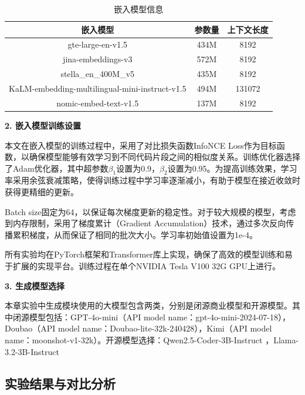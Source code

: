     \begin{table}[htbp]
    \caption{嵌入模型信息}
    \label{2_嵌入模型参数量}
    \vspace{0.5em}\centering\wuhao
    \begin{tabular}{ccc}
    \toprule
    嵌入模型 & 参数量 & 上下文长度  \\
    \midrule
    gte-large-en-v1.5 & 434M & 8192 \\
    jina-embeddings-v3 & 572M & 8192\\
    stella\_en\_400M\_v5 & 435M & 8192 \\
    KaLM-embedding-multilingual-mini-instruct-v1.5 & 494M & 131072 \\
    nomic-embed-text-v1.5 & 137M & 8192 \\
    \bottomrule
    \end{tabular}
    \end{table}

\noindent \textbf{2. 嵌入模型训练设置}

本文在嵌入模型的训练过程中，采用了对比损失函数InfoNCE Loss\cite{he2020momentum}作为目标函数，以确保模型能够有效学习到不同代码片段之间的相似度关系。训练优化器选择了Adam\cite{kingma2014adam}优化器，其中超参数$\beta_1$设置为0.9，$\beta_2$设置为0.95。为提高训练效果，学习率采用余弦衰减策略，使得训练过程中学习率逐渐减小，有助于模型在接近收敛时获得更精细的更新。

Batch size固定为64，以保证每次梯度更新的稳定性。对于较大规模的模型，考虑到内存限制，采用了梯度累计（Gradient Accumulation）技术，通过多次反向传播累积梯度，从而保证了相同的批次大小。学习率初始值设置为1e-4。

所有实验均在PyTorch框架和Transformer库上实现，确保了高效的模型训练和易于扩展的实现平台。训练过程在单个NVIDIA Tesla V100 32G GPU上进行。

\noindent \textbf{3. 生成模型选择}
    
本章实验中生成模块使用的大模型包含两类，分别是闭源商业模型和开源模型。其中闭源模型包括：GPT-4o-mini（API model name：gpt-4o-mini-2024-07-18）\cite{hurst2024gpt4o}，Doubao（API model name：Doubao-lite-32k-240428），Kimi（API model name：moonshot-v1-32k）。开源模型选择：Qwen2.5-Coder-3B-Instruct\cite{hui2024qwen2coder}\cite{yang2024qwen2} ，Llama-3.2-3B-Instruct \cite{dubey2024llama}


\subsection{实验结果与对比分析}

